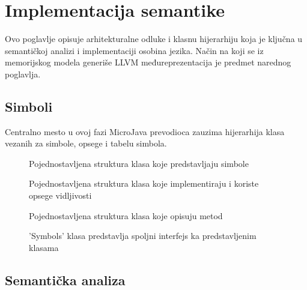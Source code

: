 \chapter{Implementacija semantike}

Ovo poglavlje opisuje arhitekturalne odluke i klasnu hijerarhiju koja je ključna u semantičkoj analizi i implementaciji osobina jezika.
Način na koji se iz memorijskog modela generiše LLVM međureprezentacija je predmet narednog poglavlja.


\section{Simboli}

Centralno mesto u ovoj fazi MicroJava prevodioca zauzima hijerarhija klasa vezanih za simbole, opsege i tabelu simbola.

\begin{figure}[h]

	\centering
	
	\caption{Pojednostavljena struktura klasa koje predstavljaju simbole}
\end{figure}


\begin{figure}[h]

	\centering
	
	\caption{Pojednostavljena struktura klasa koje implementiraju i koriste opsege vidljivosti}
\end{figure}

\begin{figure}[h]

	\centering
	
	\caption{Pojednostavljena struktura klasa koje opisuju metod}
\end{figure}

\begin{figure}[h]

	\centering
	
	\caption{'Symbols' klasa predstavlja spoljni interfejs ka predstavljenim klasama}
\end{figure}

\section{Semantička analiza}



